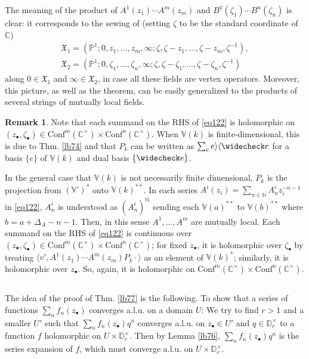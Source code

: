 \documentclass[11pt,b5paper,notitlepage]{article}
\theoremstyle{definition}
\newtheorem{rem}[df]{Remark}
\theoremstyle{plain}
\newcommand{\fk}{\mathfrak}
\newcommand{\wch}{\widecheck}
\newcommand{\tr}{\mathrm{t}} %
\newcommand{\Conf}{\mathrm{Conf}}
\newcommand{\bk}[1]{\langle {#1}\rangle}
\newcommand{\blt}{\bullet}
\newcommand{\Vbb}{\mathbb V}
\newcommand{\Cbb}{\mathbb C}
\newcommand{\Nbb}{\mathbb N}
\newcommand{\Pbb}{\mathbb P}
\newcommand{\Dbb}{\mathbb D}
\numberwithin{equation}{section}
\begin{document}
The meaning of the product of $A^1(z_1)\cdots A^m(z_m)$ and $B^1(\zeta_1)\cdots B^n(\zeta_n)$ is clear: it corresponds to the sewing of (setting $\zeta$ to be the standard coordinate of $\Cbb$)
\begin{gather*}
\fk X_1=(\Pbb^1;0,z_1,\dots,z_m,\infty;\zeta,\zeta-z_1,\dots,\zeta-z_m,\zeta^{-1}),\\
\fk X_2=(\Pbb^1;0,\zeta_1,\dots,\zeta_n,\infty;\zeta,\zeta-\zeta_1,\dots,\zeta-\zeta_n,\zeta^{-1})	
\end{gather*}
along $0\in\fk X_1$ and $\infty\in\fk X_2$, in case all these fields are vertex operators.  Moreover, this picture, as well as the theorem, can be easily generalized to the products of several strings of mutually local fields.



\begin{rem}
Note that each summand on the RHS of \eqref{eq122} is holomorphic on $(z_\blt,\zeta_\blt)\in\Conf^m(\Cbb^\times)\times\Conf^n(\Cbb^\times)$. When $\Vbb(k)$ is finite-dimensional, this is due to Thm. \ref{lb74} and that $P_k$ can be written as $\sum_e e\rangle\langle\wch e$ for a basis $\{e\}$ of $\Vbb(k)$ and dual basis $\{\wch e\}$. 

In the general case that $\Vbb(k)$ is not necessarily finite dimensional, $P_k$ is the projection from $(\Vbb')^*$ onto $\Vbb(k)^{**}$. In each series $A^i(z_i)=\sum_{n\in\Nbb}A^i_nz_i^{-n-1}$ in \eqref{eq122}, $A^i_n$ is understood as $(A^i_n)^{\tr\tr}$ sending each $\Vbb(a)^{**}$ to $\Vbb(b)^{**}$ where $b=a+\Delta_A-n-1$. Then, in this sense $A^1,\dots,A^m$ are mutually local. Each summand on the RHS of \eqref{eq122} is continuous over $(z_\blt,\zeta_\blt)\in\Conf^m(\Cbb^{\times})\times\Conf^n(\Cbb^\times)$; for fixed $z_\blt$, it is holomorphic over $\zeta_\blt$ by treating $\bk{v',A^1(z_1)\cdots A^m(z_m)P_k\cdot}$ as an element of $\Vbb(k)^*$; similarly, it is holomorphic over $z_\blt$. So, again, it is holomorphic on $\Conf^m(\Cbb^\times)\times\Conf^n(\Cbb^\times)$.
\end{rem}


\subsection{}


The idea of the proof of Thm. \ref{lb77} is the following. To show that a series of functions $\sum_n f_n(z_\blt)$ converges a.l.u. on a domain $U$: We try to find $r>1$ and a smaller $U'$ such that $\sum_n f_n(z_\blt)q^n$ converges a.l.u. on $z_\blt\in U'$ and $q\in\Dbb_r^\times$ to a function $f$ holomorphic on $U\times\Dbb_r^\times$. Then by Lemma \ref{lb76}, $\sum_n f_n(z_\blt)q^n$ is the series expansion of $f$, which must converge a.l.u. on $U\times\Dbb_r^\times$. 
\end{document}
